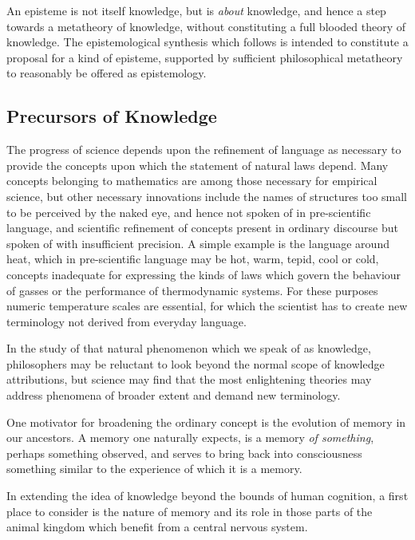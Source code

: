 \documentclass[10pt,titlepage]{book}
\newcommand{\ignore}[1]{}
\begin{document}
An episteme is not itself knowledge, but is \emph{about} knowledge, and hence a step towards a metatheory of knowledge, without constituting a full blooded theory of knowledge.
The epistemological synthesis which follows is intended to constitute a proposal for a kind of episteme, supported by sufficient philosophical metatheory to reasonably be offered as epistemology.

\subsection{Precursors of Knowledge}

The progress of science depends upon the refinement of language as necessary to provide the concepts upon which the statement of natural laws depend.
Many concepts belonging to  mathematics are among those necessary for empirical science, but other necessary innovations include the names of structures too small to be perceived by the naked eye, and hence not spoken of in pre-scientific language, and scientific refinement of concepts present in ordinary discourse but spoken of with insufficient precision.
A simple example is the language around heat, which in pre-scientific language may be hot, warm, tepid, cool or cold, concepts inadequate for expressing the kinds of laws which govern the behaviour of gasses or the performance of thermodynamic systems.
For these purposes numeric temperature scales are essential, for which the scientist has to create new terminology not derived from everyday language.

In the study of that natural phenomenon which we speak of as knowledge, philosophers may be reluctant to look beyond the normal scope of knowledge attributions, but science may find that the most enlightening theories may address phenomena of broader extent and demand new terminology.

One motivator for broadening the ordinary concept is the evolution of memory in our ancestors.
A memory one naturally expects, is a memory \emph{of something}, perhaps something observed, and serves to bring back into consciousness something similar to the experience of which it is a memory.


In extending the idea of knowledge beyond the bounds of human cognition, a first place to consider is the nature of memory and its role in those parts of the animal kingdom which benefit from a central nervous system.

\ignore{
The following concepts are useful in characterising the kinds of knowledge and its pre-cursors which become a significant part of the evolutionary history beyond its particular manifestations in homo sapiens.

\begin{itemize}
\item information
\item representation, model
\item declarative knowledge
\item episteme
\item epistemology
\end{itemize}

}%
\end{document}
